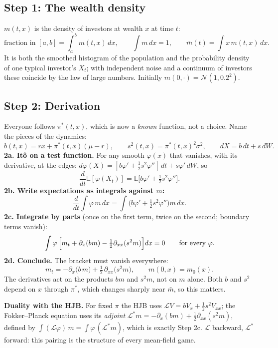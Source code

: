 \documentclass[11pt]{article}
\newcommand{\E}{\mathbb{E}}
\newcommand{\mb}{\bar m}
\begin{document}
\subsection*{Step 1: The wealth density}
$m(t,x)$ is the density of investors at wealth $x$ at time $t$:
\[
  \text{fraction in }[a,b] = \int_a^b m(t,x)\,dx,\qquad \int m\,dx = 1,\qquad
  \mb(t) = \int x\,m(t,x)\,dx .
\]
It is both the smoothed histogram of the population and the probability density of one
typical investor's $X_t$; with independent noise and a continuum of investors these coincide
by the law of large numbers. Initially $m(0,\cdot)=\mathcal N(1,0.2^2)$.

\subsection*{Step 2: Derivation}
Everyone follows $\pi^*(t,x)$, which is now a \emph{known} function, not a choice. Name the
pieces of the dynamics:
\[
  b(t,x) = rx + \pi^*(t,x)(\mu-r),\qquad s^2(t,x) = \pi^*(t,x)^2\sigma^2,\qquad
  dX = b\,dt + s\,dW .
\]
\textbf{2a. It\^o on a test function.} For any smooth $\varphi(x)$ that vanishes, with its
derivative, at the edges:
$d\varphi(X) = [b\varphi' + \tfrac12s^2\varphi'']\,dt + s\varphi'\,dW$, so
\[
  \frac{d}{dt}\E[\varphi(X_t)] = \E\bigl[b\varphi' + \tfrac12s^2\varphi''\bigr].
\]
\textbf{2b. Write expectations as integrals against $m$:}
\[
  \frac{d}{dt}\int\varphi\,m\,dx = \int\bigl(b\varphi' + \tfrac12s^2\varphi''\bigr)m\,dx .
\]
\textbf{2c. Integrate by parts} (once on the first term, twice on the second; boundary
terms vanish):
\[
  \int\varphi\,\Bigl[m_t + \partial_x(bm) - \tfrac12\partial_{xx}(s^2m)\Bigr]dx = 0
  \qquad\text{for every }\varphi .
\]
\textbf{2d. Conclude.} The bracket must vanish everywhere:
\[
  \boxed{\;m_t = -\partial_x\bigl(b\,m\bigr) + \tfrac12\,\partial_{xx}\bigl(s^2m\bigr),
  \qquad m(0,x)=m_0(x).\;}
\]
The derivatives act on the products $bm$ and $s^2m$, not on $m$ alone. Both $b$ and $s^2$
depend on $x$ through $\pi^*$, which changes sharply near $\mb$, so this matters.

\textbf{Duality with the HJB.} For fixed $\pi$ the HJB uses
$\mathcal L V = bV_x + \tfrac12s^2V_{xx}$; the Fokker--Planck equation uses its
\emph{adjoint} $\mathcal L^*m = -\partial_x(bm)+\tfrac12\partial_{xx}(s^2m)$, defined by
$\int(\mathcal L\varphi)\,m = \int\varphi\,(\mathcal L^*m)$, which is exactly Step 2c.
$\mathcal L$ backward, $\mathcal L^*$ forward: this pairing is the structure of every
mean-field game.
\end{document}
